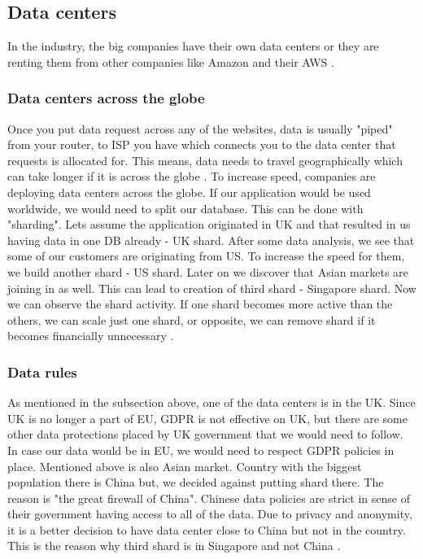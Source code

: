 \subsection{Data centers}
In the industry, the big companies have their own data centers or they are renting them from other companies like Amazon and their AWS \parencite{villamizar2016infrastructure}.
\subsubsection{Data centers across the globe}
Once you put data request across any of the websites, data is usually "piped" from your router, to ISP you have which connects you to the data center that requests is allocated for. This means, data needs to travel geographically which can take longer if it is across the globe \parencite{benson2010understanding}. 
To increase speed, companies are deploying data centers across the globe. If our application would be used worldwide, we would need to split our database. This can be done with "sharding". Lets assume the application originated in UK and that resulted in us having data in one DB already - UK shard. After some data analysis, we see that some of our customers are originating from US. To increase the speed for them, we build another shard - US shard. Later on we discover that Asian markets are joining in as well. This can lead to creation of third shard - Singapore shard.
Now we can observe the shard activity. If one shard becomes more active than the others, we can scale just one shard, or opposite, we can remove shard if it becomes financially unnecessary \parencite{alizadeh2010data}.


\subsubsection{Data rules}
As mentioned in the subsection above, one of the data centers is in the UK. Since UK is no longer a part of EU, GDPR \parencite{truong2019gdpr} is not effective on UK, but there are some other data protections placed by UK government that we would need to follow. In case our data would be in EU, we would need to respect GDPR policies in place.
Mentioned above is also Asian market. Country with the biggest population there is China but, we decided against putting shard there. The reason is "the great firewall of China". Chinese data policies are strict in sense of their government having access to all of the data. Due to privacy and anonymity, it is a better decision to have data center close to China but not in the country. This is the reason why third shard is in Singapore and not China \parencite{clayton2006ignoring}.